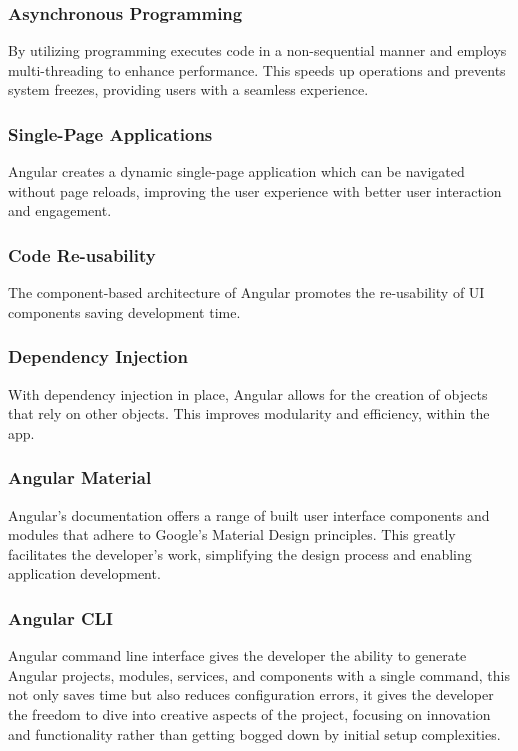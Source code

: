 \subsubsection{Asynchronous Programming} 
By utilizing programming executes code in a non-sequential manner and employs multi-threading to enhance performance. This speeds up operations and prevents system freezes, providing users with a seamless experience.
 
\subsubsection{Single-Page Applications}
Angular creates a dynamic single-page application which can be navigated without page reloads, improving the user experience with better user interaction and engagement.

\subsubsection {Code Re-usability} 
The component-based architecture of Angular promotes the re-usability of UI components saving development time.

\subsubsection{Dependency Injection} 
With dependency injection in place, Angular allows for the creation of objects that rely on other objects. This improves modularity and efficiency, within the app.

\subsubsection{Angular Material} 
Angular's documentation offers a range of built user interface components and modules that adhere to Google's Material Design principles. This greatly facilitates the developer's work, simplifying the design process and enabling application development.

\subsubsection{Angular CLI} Angular command line interface gives the developer the ability to generate Angular projects, modules, services, and components with a single command, this not only saves time but also reduces configuration errors, it gives the developer the freedom to dive into creative aspects of the project, focusing on innovation and functionality rather than getting bogged down by initial setup complexities.

